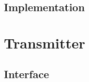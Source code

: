 \documentclass[]{article}
\begin{document}
	\subsection{Implementation} %
	\label{sub:veto_implementation}
	
	\section{Transmitter} %
	\label{sec:transmitter}
	
	\subsection{Interface} %
	\label{sub:tx_interface}
	
\end{document}
